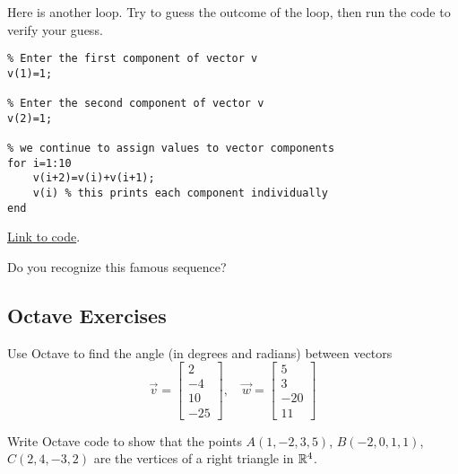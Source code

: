 \documentclass{ximera}
\begin{document}
\begin{example}\label{ex:loop2}
    Here is another loop.  Try to guess the outcome of the loop, then run the code to verify your guess.

    \begin{verbatim}
% Enter the first component of vector v
v(1)=1;

% Enter the second component of vector v
v(2)=1;

% we continue to assign values to vector components
for i=1:10
    v(i+2)=v(i)+v(i+1);
    v(i) % this prints each component individually
end
    \end{verbatim}

\href{https://sagecell.sagemath.org/?z=eJx1jjEKwzAMRXeD76AlEJOl7tiQsQcxttwIUjnYiktvXwdKmqVapC_pfX4HdxbMIDNCpFwEfHquiZEFUoSKXlKGqlXtrZnsqJVW3Ykp6BOH_9D1B72wvbEQbwiSwJVCD4bqlg3Lvvhih1XRKjZNk73Zi1bQqvY0NMfWzLDP1ozHwUDXElGBNVODAZ2fT7mIA1UKm1uWt1bI4QOvKk6t&lang=octave&interacts=eJyLjgUAARUAuQ==}{Link to code}.   

Do you recognize this famous sequence?
\end{example}

\subsection*{Octave Exercises}

\begin{problem}\label{prob_oct_vec_2}
    Use Octave to find the angle (in degrees and radians) between vectors 
    $$\vec{v}=\begin{bmatrix}2\\-4\\10\\-25\end{bmatrix},\quad\vec{w}=\begin{bmatrix}5\\3\\-20\\11\end{bmatrix}$$
\end{problem}

\begin{problem}\label{prob_oct_vec_3}
Write Octave code to show that the points $A(1, -2, 3, 5)$, $B(-2, 0, 1, 1)$, $C(2, 4, -3, 2)$ are the vertices of a right triangle in $\mathbb{R}^4$.
\end{problem}
\end{document}
